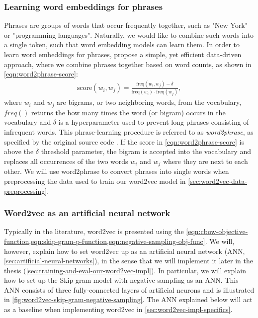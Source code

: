 \subsubsection{Learning word embeddings for phrases}
\label{sec:learning-word-embeddings-for-phrases}
Phrases are groups of words that occur frequently together, such as "New York" or "programming languages". Naturally, we would like to combine such words into a single token, such that word embedding models can learn them. In order to learn word embeddings for phrases, \cite[4 Learning Phrases]{mikolov2013b} propose a simple, yet efficient data-driven approach, where we combine phrases together based on word counts, as shown in \cref{eqn:word2phrase-score}:
\begin{align}
    \text{score}(w_i, w_j) = \frac{\text{freq}(w_i, w_j) - \delta}{\text{freq}(w_i) \cdot \text{freq}(w_j)},
    \label{eqn:word2phrase-score}
\end{align}
where $w_i$ and $w_j$ are bigrams, or two neighboring words, from the vocabulary, $freq()$ returns the how many times the word (or bigram) occurs in the vocabulary and $\delta$ is a hyperparameter used to prevent long phrases consisting of infrequent words. This phrase-learning procedure is referred to as \textit{word2phrase}, as specified by the original source code \cites{Word2phraseCCode}. If the score in \cref{eqn:word2phrase-score} is above the $\delta$ threshold parameter, the bigram is accepted into the vocabulary and replaces all occurrences of the two words $w_i$ and $w_j$ where they are next to each other. We will use word2phrase to convert phrases into single words when preprocessing the data used to train our word2vec model in \cref{sec:word2vec-data-preprocessing}.

\subsubsection{Word2vec as an artificial neural network}
\label{sec:word2vec-as-an-ann}
Typically in the literature, word2vec is presented using the \cref{eqn:cbow-objective-function,eqn:skip-gram-p-function,eqn:negative-sampling-obj-func}. We will, however, explain how to set word2vec up as an artificial neural network (ANN, \cref{sec:artificial-neural-networks}), in the sense that we will implement it later in the thesis (\cref{sec:training-and-eval-our-word2vec-impl}). In particular, we will explain how to set up the Skip-gram model with negative sampling as an ANN. This ANN consists of three fully-connected layers of artificial neurons \cite{rong2016word2vec} and is illustrated in \cref{fig:word2vec-skip-gram-negative-sampling}. The ANN explained below will act as a baseline when implementing word2vec in \cref{sec:word2vec-impl-specifics}.

